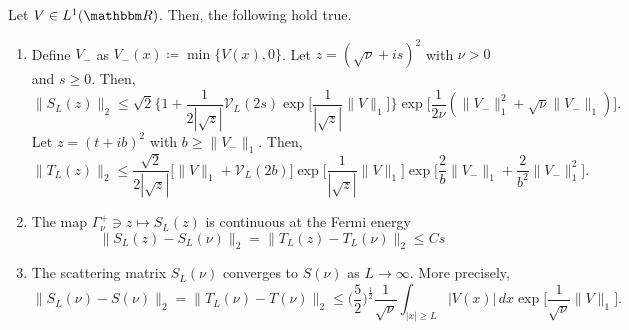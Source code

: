 \begin{lemma}\label{wo02t}
Let $V\in L^1(\R)$. Then, the following hold true.
\begin{enumerate}
\item 
Define $V_-$ as $V_-(x) \coloneqq \min\{ V(x) ,0\}$. Let $z=(\sqrt{\nu}+is)^2$ with $\nu>0$ and $s\geq0$. Then,
\begin{equation} \label{wo02t01}
  \| S_L(z) \|_2 \leq  \sqrt{2}\Big\{ 1+ \frac{1}{2|\sqrt{z}|}\mathcal{V}_L(2s) \exp\Big[ \frac{1}{|\sqrt{z}|}\|V\|_1 \Big] \Big\}
                        \exp\Big[ \frac{1}{2\nu} ( \| V_-\|_1^2 + \sqrt{\nu} \| V_-\|_1 )\Big] .
\end{equation}
Let $z=(t+ib)^2$ with $b\geq \|V_-\|_1$. Then,
\begin{equation}\label{wo02t01a}
  \|T_L(z) \|_2  \leq \frac{\sqrt{2}}{2|\sqrt{z}|}\big[ \|V\|_1 + \mathcal{V}_L(2b) \big]\exp\Big[ \frac{1}{|\sqrt{z}|}\|V\|_1 \Big]
                  \exp\big[ \frac{2}{b}\|V_-\|_1 + \frac{2}{b^2}\|V_-\|_1^2\big] .
\end{equation}
\item
The map $\Gamma_\nu^+\ni z \mapsto S_L(z)$ is continuous at the Fermi energy
\begin{equation}\label{wo02t02}
  \| S_L(z) - S_L(\nu) \|_2 = \| T_L(z) - T_L(\nu) \|_2 \leq C s
\end{equation}
\item
The scattering matrix $S_L(\nu)$ converges to $S(\nu)$ as $L\to\infty$. More precisely,
\begin{equation}\label{wo02t03}
  \| S_L(\nu) - S(\nu) \|_2 = \| T_L(\nu) - T(\nu) \|_2
     \leq \Big(\frac{5}{2}\Big)^{\frac{1}{2}}\frac{1}{\sqrt{\nu}} \int_{|x|\geq L} |V(x)|\, dx \exp\big[\frac{1}{\sqrt{\nu}}\|V\|_1\big].
\end{equation}
\end{enumerate}
\end{lemma}
